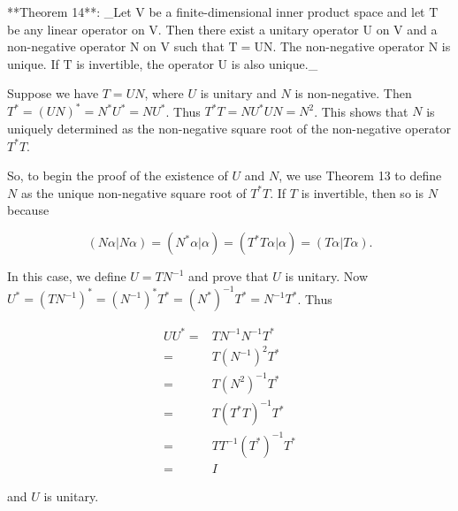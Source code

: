 

**Theorem 14**: _Let \(\mathrm{V}\) be a finite-dimensional inner product space and let \(\mathrm{T}\) be any linear operator on \(\mathrm{V}\). Then there exist a unitary operator \(\mathrm{U}\) on \(\mathrm{V}\) and a non-negative operator \(\mathrm{N}\) on \(\mathrm{V}\) such that \(\mathrm{T}=\mathrm{UN}\). The non-negative operator \(\mathrm{N}\) is unique. If \(\mathrm{T}\) is invertible, the operator \(\mathrm{U}\) is also unique._

Suppose we have \(\mathit{T}=\mathit{UN}\), where \(\mathit{U}\) is unitary and \(\mathit{N}\) is non-negative. Then \(\mathit{T}^{*}=(\mathit{UN})^{*}=\mathit{N}^{*}\mathit{U}^{*}=\mathit{NU}^{*}\). Thus \(\mathit{T}^{*}\mathit{T}=\mathit{NU}^{*}\mathit{UN}=\mathit{N}^{2}\). This shows that \(\mathit{N}\) is uniquely determined as the non-negative square root of the non-negative operator \(\mathit{T}^{*}\mathit{T}\).

So, to begin the proof of the existence of \(\mathit{U}\) and \(\mathit{N}\), we use Theorem 13 to define \(\mathit{N}\) as the unique non-negative square root of \(\mathit{T}^{*}\mathit{T}\). If \(\mathit{T}\) is invertible, then so is \(\mathit{N}\) because

\[(\mathit{N}\alpha|\mathit{N}\alpha)=(\mathit{N}^{*}\alpha|\alpha)=(\mathit{T} ^{*}\mathit{T}\alpha|\alpha)=(\mathit{T}\alpha|\mathit{T}\alpha).\]

In this case, we define \(\mathit{U}=\mathit{TN}^{-1}\) and prove that \(\mathit{U}\) is unitary. Now \(\mathit{U}^{*}=(\mathit{TN}^{-1})^{*}=(\mathit{N}^{-1})^{*}\mathit{T}^{*}=( \mathit{N}^{*})^{-1}\mathit{T}^{*}=\mathit{N}^{-1}\mathit{T}^{*}\). Thus

\[\begin{array}{rl}\mathit{UU}^{*}=&\mathit{TN}^{-1}\mathit{N}^{-1}\mathit{T }^{*}\\ =&\mathit{T}(\mathit{N}^{-1})^{2}\mathit{T}^{*}\\ =&\mathit{T}(\mathit{N}^{2})^{-1}\mathit{T}^{*}\\ =&\mathit{T}(\mathit{T}^{*}\mathit{T})^{-1}\mathit{T}^{*}\\ =&\mathit{T}\mathit{T}^{-1}(\mathit{T}^{*})^{-1}\mathit{T}^{*}\\ =&\mathit{I}\end{array}\]

and \(\mathit{U}\) is unitary.

